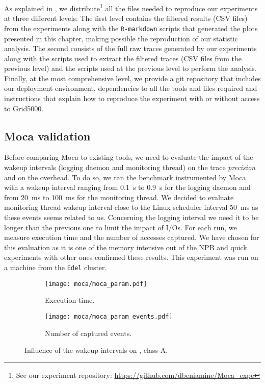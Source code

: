 As explained in , we distribute\footnote{
    See our experiment repository:
    \url{https://github.com/dbeniamine/Moca_expe}
} all the files needed to reproduce our experiments at three different levels:
The first level contains the filtered results (\gls{CSV} files) from the experiments along with the \texttt{R-markdown} scripts that generated the plots presented in this chapter, making possible the reproduction of our statistic analysis.
The second consists of the full raw traces generated by our experiments along with the scripts used to extract the filtered traces (\gls{CSV} files from the previous level) and the scripts used at the previous level to perform the analysis.
Finally, at the most comprehensive level, we provide a git repository that includes our deployment environment, dependencies to all the tools and files required and instructions that explain how to reproduce the experiment with or without access to \gls{Grid5000}.

\subsection{Moca validation}
\label{sec:expe-param}

Before comparing \gls{Moca} to existing tools, we need to evaluate the impact of the wakeup intervals (logging daemon and monitoring thread) on the trace \emph{precision} and on the overhead.
To do so, we ran the \IS benchmark instrumented by \gls{Moca} with a wakeup interval ranging from \SI{0.1}{s} to  \SI{0.9}{s} for the logging daemon and from \SI{20}{ms} to \SI{100}{ms} for the monitoring thread.
We decided to evaluate monitoring thread wakeup interval close to the \gls{Linux} scheduler interval \SI{50}{ms} as these events seems related to us.
Concerning the logging interval we need it to be longer than the previous one to limit the impact of \glspl{I/O}.
For each run, we measure \IS execution time and the number of accesses captured.
We have chosen \IS for this evaluation as it is one of the memory intensive out of the \gls{NPB} and quick experiments with other ones confirmed these results.
This experiment was run on a machine from the \texttt{Edel} cluster.

\begin{figure}[htb]
    \centering
    \begin{subfigure}{.73\linewidth}
        \texttt{[image: moca/moca\_param.pdf]}
        \caption{Execution time.}
        \label{fig:param_time}
    \end{subfigure}
    \begin{subfigure}{.73\linewidth}
        \texttt{[image: moca/moca\_param\_events.pdf]}
        \caption{Number of captured events.}
        \label{fig:param_evts}
    \end{subfigure}
    \caption[Influence of Moca wakeup intervals.]{Influence of the wakeup intervals on \IS, class A.}
    \label{fig:param}
\end{figure}

